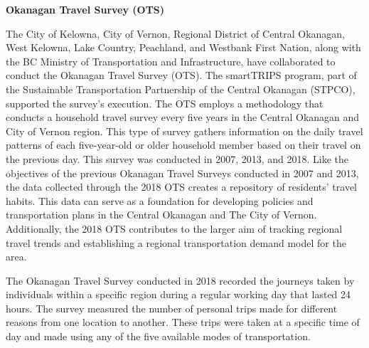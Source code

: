 \documentclass[12pt,twoside]{reedthesis}
\begin{document}
\textbf{Okanagan Travel Survey (OTS)}

The City of Kelowna, City of Vernon, Regional District of Central Okanagan, West Kelowna, Lake Country, Peachland, and Westbank First Nation, along with the BC Ministry of Transportation and Infrastructure, have collaborated to conduct the Okanagan Travel Survey (OTS). The smartTRIPS program, part of the Sustainable Transportation Partnership of the Central Okanagan (STPCO), supported the survey's execution. The OTS employs a methodology that conducts a household travel survey every five years in the Central Okanagan and City of Vernon region. This type of survey gathers information on the daily travel patterns of each five-year-old or older household member based on their travel on the previous day. This survey was conducted in 2007, 2013, and 2018. Like the objectives of the previous Okanagan Travel Surveys conducted in 2007 and 2013, the data collected through the 2018 OTS creates a repository of residents' travel habits. This data can serve as a foundation for developing policies and transportation plans in the Central Okanagan and The City of Vernon. Additionally, the 2018 OTS contributes to the larger aim of tracking regional travel trends and establishing a regional transportation demand model for the area.

The Okanagan Travel Survey conducted in 2018 recorded the journeys taken by individuals within a specific region during a regular working day that lasted 24 hours. The survey measured the number of personal trips made for different reasons from one location to another. These trips were taken at a specific time of day and made using any of the five available modes of transportation.
\end{document}
